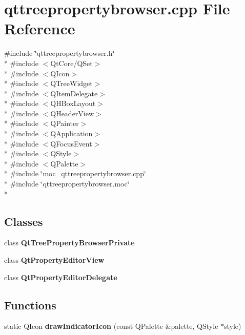 \section{qttreepropertybrowser.\+cpp File Reference}
\label{qttreepropertybrowser_8cpp}
{\ttfamily \#include \char`\"{}qttreepropertybrowser.\+h\char`\"{}}\\*
{\ttfamily \#include $<$Qt\+Core/\+Q\+Set$>$}\\*
{\ttfamily \#include $<$Q\+Icon$>$}\\*
{\ttfamily \#include $<$Q\+Tree\+Widget$>$}\\*
{\ttfamily \#include $<$Q\+Item\+Delegate$>$}\\*
{\ttfamily \#include $<$Q\+H\+Box\+Layout$>$}\\*
{\ttfamily \#include $<$Q\+Header\+View$>$}\\*
{\ttfamily \#include $<$Q\+Painter$>$}\\*
{\ttfamily \#include $<$Q\+Application$>$}\\*
{\ttfamily \#include $<$Q\+Focus\+Event$>$}\\*
{\ttfamily \#include $<$Q\+Style$>$}\\*
{\ttfamily \#include $<$Q\+Palette$>$}\\*
{\ttfamily \#include \char`\"{}moc\+\_\+qttreepropertybrowser.\+cpp\char`\"{}}\\*
{\ttfamily \#include \char`\"{}qttreepropertybrowser.\+moc\char`\"{}}\\*
\subsection*{Classes}
\begin{DoxyCompactItemize}
\item 
class {\bf Qt\+Tree\+Property\+Browser\+Private}
\item 
class {\bf Qt\+Property\+Editor\+View}
\item 
class {\bf Qt\+Property\+Editor\+Delegate}
\end{DoxyCompactItemize}
\subsection*{Functions}
\begin{DoxyCompactItemize}
\item 
static Q\+Icon {\bf draw\+Indicator\+Icon} (const Q\+Palette \&palette, Q\+Style $\ast$style)
\end{DoxyCompactItemize}


